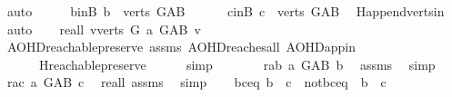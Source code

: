 \begin{isabellebody}
\ auto\isanewline
\ \ \isamarkupfalse%
\ \isamarkupfalse%
\ b{\isacharunderscore}{\kern0pt}inB{\isacharcolon}{\kern0pt}\ {\isachardoublequoteopen}b\ {\isasymin}\ verts\ G{\isacharunderscore}{\kern0pt}AB{\isachardoublequoteclose}\ \isanewline
\ \ \ \ \ c{\isacharunderscore}{\kern0pt}inB{\isacharcolon}{\kern0pt}\ {\isachardoublequoteopen}c\ {\isasymin}\ verts\ G{\isacharunderscore}{\kern0pt}AB{\isachardoublequoteclose}\ \isamarkupfalse%
\ H{}{\isachardot}{\kern0pt}append{\isacharunderscore}{\kern0pt}verts{\isacharunderscore}{\kern0pt}in\ \ \isamarkupfalse%
\ auto\isanewline
\ \ \isamarkupfalse%
\ re{\isacharunderscore}{\kern0pt}all{\isacharcolon}{\kern0pt}\ {\isachardoublequoteopen}{\isasymforall}v{\isasymin}verts\ G{\isachardot}{\kern0pt}\ a\ {\isasymrightarrow}\isactrlsup {\isacharplus}{\kern0pt}\isactrlbsub G{\isacharunderscore}{\kern0pt}AB\isactrlesub \ v{\isachardoublequoteclose}\ \isanewline
\ \ \ \ \isamarkupfalse%
\ AOHD{\isachardot}{\kern0pt}reachable{}{\isacharunderscore}{\kern0pt}preserve{}\ assms{\isacharparenleft}{\kern0pt}{}{\isacharparenright}{\kern0pt}\ AOHD{\isachardot}{\kern0pt}reaches{\isacharunderscore}{\kern0pt}all\ AOHD{\isachardot}{\kern0pt}app{\isacharunderscore}{\kern0pt}in\isanewline
\ \ \ \ \ \ H{}{\isachardot}{\kern0pt}reachable{}{\isacharunderscore}{\kern0pt}preserve\isanewline
\ \ \ \ \isamarkupfalse%
\ simp\ \ \isanewline
\ \ \isamarkupfalse%
\ \isamarkupfalse%
\ r{\isacharunderscore}{\kern0pt}ab{\isacharcolon}{\kern0pt}\ {\isachardoublequoteopen}a\ {\isasymrightarrow}\isactrlsup {\isacharplus}{\kern0pt}\isactrlbsub G{\isacharunderscore}{\kern0pt}AB\isactrlesub \ b{\isachardoublequoteclose}\ \isamarkupfalse%
\ assms{\isacharparenleft}{\kern0pt}{}{\isacharparenright}{\kern0pt}\ \isamarkupfalse%
\ simp\isanewline
\ \ \isamarkupfalse%
\ r{\isacharunderscore}{\kern0pt}ac{\isacharcolon}{\kern0pt}\ {\isachardoublequoteopen}a\ {\isasymrightarrow}\isactrlsup {\isacharplus}{\kern0pt}\isactrlbsub G{\isacharunderscore}{\kern0pt}AB\isactrlesub \ c{\isachardoublequoteclose}\ \isamarkupfalse%
\ re{\isacharunderscore}{\kern0pt}all\ assms{\isacharparenleft}{\kern0pt}{}{\isacharparenright}{\kern0pt}\ \isamarkupfalse%
\ simp\isanewline
\ \ \isamarkupfalse%
\ {\isacharparenleft}{\kern0pt}b{\isacharunderscore}{\kern0pt}c{\isacharunderscore}{\kern0pt}eq{\isacharparenright}{\kern0pt}\ {\isachardoublequoteopen}b\ {\isacharequal}{\kern0pt}\ c{\isachardoublequoteclose}\ {\isacharbar}{\kern0pt}\ {\isacharparenleft}{\kern0pt}not{\isacharunderscore}{\kern0pt}b{\isacharunderscore}{\kern0pt}c{\isacharunderscore}{\kern0pt}eq{\isacharparenright}{\kern0pt}\ {\isachardoublequoteopen}{\isasymnot}\ b\ {\isacharequal}{\kern0pt}\ c{\isachardoublequoteclose}\ \isamarkupfalse%

\end{isabellebody}
